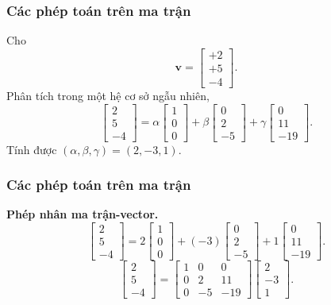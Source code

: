 \begin{frame}
    \frametitle{Các phép toán trên ma trận}
    Cho \[\mathbf{v}=\begin{bmatrix}
    +2\\+5\\-4
\end{bmatrix}.\] Phân tích trong một hệ cơ sở ngẫu nhiên,
\[\begin{bmatrix}
    2\\5\\-4
\end{bmatrix}=\alpha\begin{bmatrix}
    1\\0\\0
\end{bmatrix}+\beta\begin{bmatrix}
    0\\2\\-5
\end{bmatrix}+\gamma\begin{bmatrix}
    0\\11\\-19
\end{bmatrix}.\]
Tính được \((\alpha,\beta,\gamma)=(2,-3,1)\).
\end{frame}
\begin{frame}
    \frametitle{Các phép toán trên ma trận}
    \textbf{Phép nhân ma trận-vector.}
    \[\begin{bmatrix}
    2\\5\\-4
\end{bmatrix}=2\begin{bmatrix}
    1\\0\\0
\end{bmatrix}+(-3)\begin{bmatrix}
    0\\2\\-5
\end{bmatrix}+1\begin{bmatrix}
    0\\11\\-19
\end{bmatrix}.\]
    \[\begin{bmatrix}
    2\\5\\-4
\end{bmatrix}=\begin{bmatrix}
    1&0&0\\
    0&2&11\\
    0&-5&-19
\end{bmatrix}\begin{bmatrix}
    2\\-3\\1
\end{bmatrix}.\]
\end{frame}
